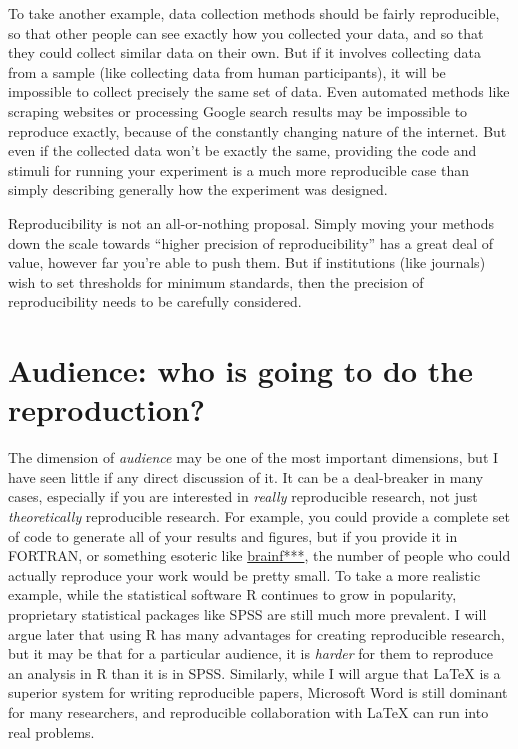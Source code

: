 \documentclass{book}
\begin{document}
To take another example, data collection methods should be fairly reproducible, so that other people can see exactly how you collected your data, and so that they could collect similar data on their own. But if it involves collecting data from a sample (like collecting data from human participants), it will be impossible to collect precisely the same set of data.  Even automated methods like scraping websites or processing Google search results may be impossible to reproduce exactly, because of the constantly changing nature of the internet.  But even if the collected data won't be exactly the same, providing the code and stimuli for running your experiment is a much more reproducible case than simply describing generally how the experiment was designed.

Reproducibility is not an all-or-nothing proposal. Simply moving your methods down the scale towards ``higher precision of reproducibility'' has a great deal of value, however far you're able to push them.  But if institutions (like journals) wish to set thresholds for minimum standards, then the precision of reproducibility needs to be carefully considered.
\section{Audience: who is going to do the reproduction?}
\label{sec-3-3}

The dimension of \emph{audience} may be one of the most important dimensions, but I have seen little if any direct discussion of it. It can be a deal-breaker in many cases, especially if you are interested in \emph{really} reproducible research, not just \emph{theoretically} reproducible research. For example, you could provide a complete set of code to generate all of your results and figures, but if you provide it in FORTRAN, or something esoteric like \href{http://en.wikipedia.org/wiki/Brainfuck}{brainf***}, the number of people who could actually reproduce your work would be pretty small.  To take a more realistic example, while the statistical software R continues to grow in popularity, proprietary statistical packages like SPSS are still much more prevalent. I will argue later that using R has many advantages for creating reproducible research, but it may be that for a particular audience, it is \emph{harder} for them to reproduce an analysis in R than it is in SPSS.  Similarly, while I will argue that \LaTeX{} is a superior system for writing reproducible papers, Microsoft Word is still dominant for many researchers, and reproducible collaboration with \LaTeX{} can run into real problems.
\end{document}
